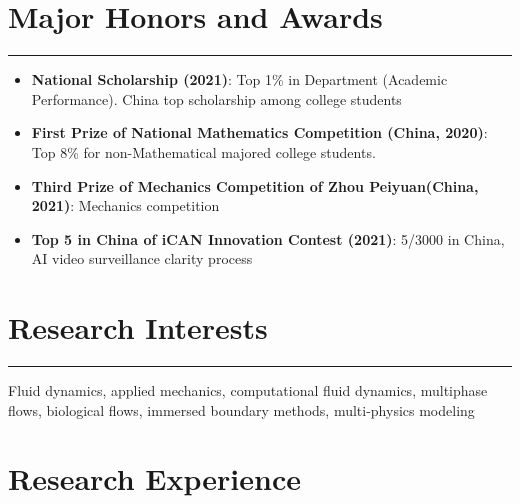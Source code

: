 \documentclass[11pt]{article}
\begin{document}
\vspace{6mm}

\section*{Major Honors and Awards}
\hrule

\begin{itemize}[leftmargin=*,itemsep=1pt]
    \item \textbf{National Scholarship (2021)}: Top 1\% in Department (Academic Performance). 
    China top scholarship among college students
    \item \textbf{First Prize of National Mathematics Competition (China, 2020)}: Top 8\% for non-Mathematical majored college students.
    \item \textbf{Third Prize of Mechanics Competition of Zhou Peiyuan(China, 2021)}: Mechanics competition 
    \item \textbf{Top 5 in China of iCAN Innovation Contest (2021)}: 5/3000 in China, AI video surveillance clarity process
\end{itemize}

\vspace{6mm}

\section*{Research Interests}
\hrule

\noindent Fluid dynamics, applied mechanics, computational fluid dynamics, multiphase flows, biological flows, immersed boundary methods, multi-physics modeling

\vspace{6mm}

\section*{Research Experience}
\end{document}
